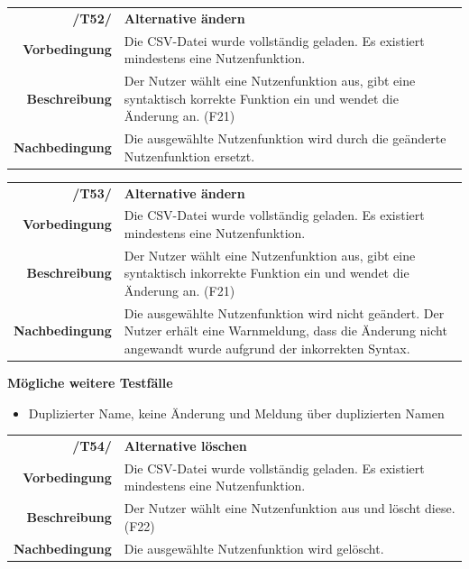 \documentclass{article}
\begin{document}
\begin{table}[H]
\begin{tabularx}{\textwidth}{rX}
\textbf{/T52/}         & \textbf{Alternative ändern} \\
\textbf{Vorbedingung}  & Die CSV-Datei wurde vollständig geladen. Es existiert mindestens eine Nutzenfunktion.  \\
\textbf{Beschreibung}  & Der Nutzer wählt eine Nutzenfunktion aus, gibt eine syntaktisch korrekte Funktion ein und wendet die Änderung an. (F21) \\
\textbf{Nachbedingung} & Die ausgewählte Nutzenfunktion wird durch die geänderte Nutzenfunktion ersetzt.
\end{tabularx}
\end{table}

\begin{table}[H]
\begin{tabularx}{\textwidth}{rX}
\textbf{/T53/}         & \textbf{Alternative ändern} \\
\textbf{Vorbedingung}  & Die CSV-Datei wurde vollständig geladen. Es existiert mindestens eine Nutzenfunktion.   \\
\textbf{Beschreibung}  & Der Nutzer wählt eine Nutzenfunktion aus, gibt eine syntaktisch inkorrekte Funktion ein und wendet die Änderung an. (F21) \\
\textbf{Nachbedingung} & Die ausgewählte Nutzenfunktion wird nicht geändert. Der Nutzer erhält eine Warnmeldung, dass die Änderung nicht angewandt wurde aufgrund der inkorrekten Syntax.
\end{tabularx}
\end{table}
\textbf{Mögliche weitere Testfälle}
\begin{itemize}
    \item Duplizierter Name, keine Änderung und Meldung über duplizierten Namen
\end{itemize}

\begin{table}[H]
\begin{tabularx}{\textwidth}{rX}
\textbf{/T54/}         & \textbf{Alternative löschen} \\
\textbf{Vorbedingung}  & Die CSV-Datei wurde vollständig geladen. Es existiert mindestens eine Nutzenfunktion.  \\
\textbf{Beschreibung}  & Der Nutzer wählt eine Nutzenfunktion aus und löscht diese. (F22) \\
\textbf{Nachbedingung} & Die ausgewählte Nutzenfunktion wird gelöscht.
\end{tabularx}
\end{table}
\end{document}
